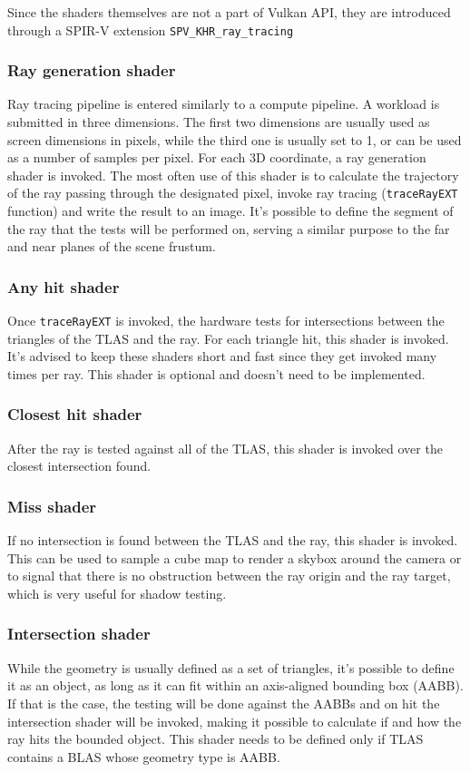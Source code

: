 \documentclass[times, utf8, zavrsni, numeric]{fer}
\begin{document}
Since the shaders themselves are not a part of Vulkan API, they are introduced through a SPIR-V extension \texttt{SPV\_KHR\_ray\_tracing}

\subsubsection{Ray generation shader}
Ray tracing pipeline is entered similarly to a compute pipeline. A workload is submitted in three dimensions. The first two dimensions are usually used as screen dimensions in pixels, while the third one is usually set to 1, or can be used as a number of samples per pixel. For each 3D coordinate, a ray generation shader is invoked. The most often use of this shader is to calculate the trajectory of the ray passing through the designated pixel, invoke ray tracing (\texttt{traceRayEXT} function) and write the result to an image. It's possible to define the segment of the ray that the tests will be performed on, serving a similar purpose to the far and near planes of the scene frustum.

\subsubsection{Any hit shader}
Once \texttt{traceRayEXT} is invoked, the hardware tests for intersections between the triangles of the TLAS and the ray. For each triangle hit, this shader is invoked. It's advised to keep these shaders short and fast since they get invoked many times per ray. This shader is optional and doesn't need to be implemented.

\subsubsection{Closest hit shader}
After the ray is tested against all of the TLAS, this shader is invoked over the closest intersection found.

\subsubsection{Miss shader}
If no intersection is found between the TLAS and the ray, this shader is invoked. This can be used to sample a cube map to render a skybox around the camera or to signal that there is no obstruction between the ray origin and the ray target, which is very useful for shadow testing.

\subsubsection{Intersection shader}
While the geometry is usually defined as a set of triangles, it's possible to define it as an object, as long as it can fit within an axis-aligned bounding box (AABB). If that is the case, the testing will be done against the AABBs and on hit the intersection shader will be invoked, making it possible to calculate if and how the ray hits the bounded object. This shader needs to be defined only if TLAS contains a BLAS whose geometry type is AABB.
\end{document}
